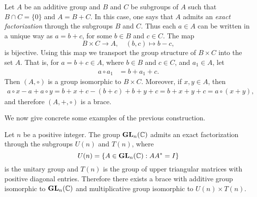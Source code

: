 \begin{example}
    \label{exa:WX}
    Let $A$ be an additive group
	and $B$ and $C$ be subgroups of $A$ such that $B\cap C=\{ 0\}$ and $A=B+C$. In this case, one says that $A$ admits an {\em exact factorization} through the subgroups $B$ and $C$.  Thus each $a\in A$ can be written in a unique
	way as $a=b+c$, for some $b\in B$ and $c\in C$.  The map
	\[
		B\times C\to A,\quad
		(b,c)\mapsto b-c,
	\]
	is bijective. Using this map we transport the group structure of 
	$B\times C$ into the set $A$. That is, for $a=b+c\in A$, where $b\in B$ and $c\in C$, and
	$a_1\in A$, let 
	\begin{align*}
		a\circ a_1&=b+a_1+c.
	\end{align*}
	Then $(A,\circ)$ is a group isomorphic to $B\times C$. Moreover, if $x,y\in A$, 
	then 
	\begin{align*}
	a\circ x-a+a\circ y=b+x+c-(b+c)+b+y+c=b+x+y+c=a\circ (x+y),
	\end{align*}
	and therefore $(A,+,\circ)$ is a brace. 
\end{example}


We now give concrete some examples of the previous construction. 

\begin{example}
  \label{exa:QR}
  Let $n$ be a positive integer. 
  The group $\mathbf{GL}_n(\mathbb{C})$ admits an
  exact factorization through the subgroups $U(n)$ and $T(n)$, where 
  \[
  U(n)=\{ A\in\mathbf{GL}_n(\mathbb{C}): AA^*=I\}
  \]
  is the unitary group and $T(n)$ is the group of upper triangular matrices
  with positive diagonal entries.  Therefore there exists a brace with additive group 
  isomorphic to $\mathbf{GL}_n(\mathbb{C})$ and multiplicative group isomorphic to $U(n)\times T(n)$.  
\end{example}

